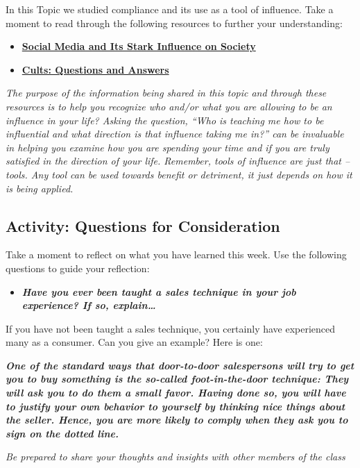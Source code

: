 \documentclass[
]{book}
\providecommand{\tightlist}{%
  \setlength{\itemsep}{0pt}\setlength{\parskip}{0pt}}
\begin{document}
\begin{reflect}
In this Topic we studied compliance and its use as a tool of influence. Take a moment to read through the following resources to further your understanding:

\begin{itemize}
\tightlist
\item
  \href{https://scholarworks.bgsu.edu/cgi/viewcontent.cgi?article=1004\&context=writ}{\textbf{Social Media and Its Stark Influence on Society }}\\
\item
  \href{https://cultrecovery101.com/cults-questions-and-answers/}{\textbf{Cults: Questions and Answers}}
\end{itemize}

\emph{The purpose of the information being shared in this topic and through these resources is to help you recognize who and/or what you are allowing to be an influence in your life? Asking the question, ``Who is teaching me how to be influential and what direction is that influence taking me in?'' can be invaluable in helping you examine how you are spending your time and if you are truly satisfied in the direction of your life. Remember, tools of influence are just that -- tools. Any tool can be used towards benefit or detriment, it just depends on how it is being applied.}
\end{reflect}

\hypertarget{activity-questions-for-consideration-11}{%
\subsection*{Activity: Questions for Consideration}\label{activity-questions-for-consideration-11}}

\begin{reflect}
Take a moment to reflect on what you have learned this week. Use the following questions to guide your reflection:

\begin{itemize}
\tightlist
\item
  \textbf{\emph{Have you ever been taught a sales technique in your job experience? If so, explain\ldots{}}}
\end{itemize}

If you have not been taught a sales technique, you certainly have experienced many as a consumer. Can you give an example? Here is one:

\textbf{\emph{One of the standard ways that door-to-door salespersons will try to get you to buy something is the so-called foot-in-the-door technique: They will ask you to do them a small favor. Having done so, you will have to justify your own behavior to yourself by think­ing nice things about the seller. Hence, you are more likely to comply when they ask you to sign on the dotted line.}}

\emph{Be prepared to share your thoughts and insights with other members of the class}
\end{reflect}
\end{document}
